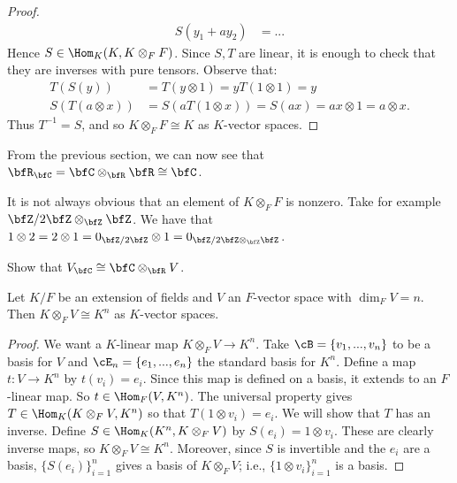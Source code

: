 \begin{proof}
\begin{equation*}
                \begin{split}
                    S(y_1 + a y_2)
                    & = ... 
                \end{split}
                \end{equation*}
            Hence $S \in \Hom_K(K,K \otimes_F F)$. Since $S,T$ are linear, it is enough to check that they are inverses with pure tensors. Observe that:
                \begin{equation*}
                \begin{split}
                    T(S(y)) &= T(y \otimes 1) = y T(1 \otimes 1) = y \\
                    S(T(a \otimes x)) &= S(a T(1 \otimes x)) = S(ax) = ax \otimes 1 = a \otimes x.
                \end{split}
                \end{equation*}
            Thus $T^{-1} = S$, and so $K \otimes_F F  \cong K$ as $K$-vector spaces.
        \end{proof}

    \begin{example}
        From the previous section, we can now see that $\bfR_\bfC = \bfC \otimes_\bfR \bfR \cong \bfC$.
    \end{example}

    \begin{example}
        It is not always obvious that an element of $K \otimes_F F$ is nonzero. Take for example $\bfZ/2\bfZ \otimes_\bfZ \bfZ$. We have that $1 \otimes 2 = 2 \otimes 1 = 0_{\bfZ/2\bfZ} \otimes 1 = 0_{\bfZ/2\bfZ \otimes_\bfZ \bfZ}$.
    \end{example}

    \begin{exercise}
        Show that $V_\bfC \cong \bfC \otimes_\bfR V$.
    \end{exercise}

    \begin{proposition}
        Let $K/F$ be an extension of fields and $V$ an $F$-vector space with $\dim_F V = n$. Then $K \otimes_F V \cong K^n$ as $K$-vector spaces.
    \end{proposition}
        \begin{proof}
            We want a $K$-linear map $K \otimes_F V \rightarrow K^n$. Take $\cB = \{v_1,...,v_n\}$ to be a basis for $V$ and $\cE_n = \{e_1,...,e_n\}$ the standard basis for $K^n$. Define a map $t:V \rightarrow K^n$ by $t(v_i) = e_i$. Since this map is defined on a basis, it extends to an $F$-linear map. So $t \in \Hom_F(V,K^n)$. The universal property gives $T \in \Hom_K(K \otimes_F V, K^n)$ so that $T(1 \otimes v_i) = e_i$. We will show that $T$ has an inverse. Define $S \in \Hom_K(K^n,K \otimes_F V)$ by $S(e_i) = 1 \otimes v_i$. These are clearly inverse maps, so $K \otimes_F V \cong K^n$. Moreover, since $S$ is invertible and the $e_i$ are a basis, $\{S(e_i)\}_{i =1}^n$ gives a basis of $K \otimes_F V$; i.e., $\{1 \otimes v_i\}_{i = 1}^n$ is a basis.
        \end{proof}


